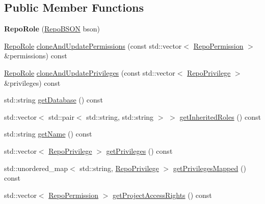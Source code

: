 \subsection*{Public Member Functions}
\begin{DoxyCompactItemize}
\item 
\hypertarget{classrepo_1_1core_1_1model_1_1_repo_role_af9ddc044e897b262065504697e87d756}{}{\bfseries Repo\+Role} (\hyperlink{classrepo_1_1core_1_1model_1_1_repo_b_s_o_n}{Repo\+B\+S\+O\+N} bson)\label{classrepo_1_1core_1_1model_1_1_repo_role_af9ddc044e897b262065504697e87d756}

\item 
\hyperlink{classrepo_1_1core_1_1model_1_1_repo_role}{Repo\+Role} \hyperlink{classrepo_1_1core_1_1model_1_1_repo_role_abdb1f705fc8aa347ffdfbb382fa36160}{clone\+And\+Update\+Permissions} (const std\+::vector$<$ \hyperlink{structrepo_1_1core_1_1model_1_1_repo_permission}{Repo\+Permission} $>$ \&permissions) const 
\item 
\hyperlink{classrepo_1_1core_1_1model_1_1_repo_role}{Repo\+Role} \hyperlink{classrepo_1_1core_1_1model_1_1_repo_role_ac4e6810785f991ba81a93303237755b8}{clone\+And\+Update\+Privileges} (const std\+::vector$<$ \hyperlink{structrepo_1_1core_1_1model_1_1_repo_privilege}{Repo\+Privilege} $>$ \&privileges) const 
\item 
std\+::string \hyperlink{classrepo_1_1core_1_1model_1_1_repo_role_a81cff4cca13d027e88e7020338b004f3}{get\+Database} () const 
\item 
std\+::vector$<$ std\+::pair$<$ std\+::string, std\+::string $>$ $>$ \hyperlink{classrepo_1_1core_1_1model_1_1_repo_role_a6b7b3309caf6cd2bf0aec3b3f8ed68a4}{get\+Inherited\+Roles} () const 
\item 
std\+::string \hyperlink{classrepo_1_1core_1_1model_1_1_repo_role_ac57aefb6a3ae9fdf9f7796d604a674ac}{get\+Name} () const 
\item 
std\+::vector$<$ \hyperlink{structrepo_1_1core_1_1model_1_1_repo_privilege}{Repo\+Privilege} $>$ \hyperlink{classrepo_1_1core_1_1model_1_1_repo_role_a6e4e64c76b02513aef77ab5f4af9ff59}{get\+Privileges} () const 
\item 
std\+::unordered\+\_\+map$<$ std\+::string, \hyperlink{structrepo_1_1core_1_1model_1_1_repo_privilege}{Repo\+Privilege} $>$ \hyperlink{classrepo_1_1core_1_1model_1_1_repo_role_a793296fd3b70c40528bb30550f71c4b9}{get\+Privileges\+Mapped} () const 
\item 
std\+::vector$<$ \hyperlink{structrepo_1_1core_1_1model_1_1_repo_permission}{Repo\+Permission} $>$ \hyperlink{classrepo_1_1core_1_1model_1_1_repo_role_a8058f6f6ac80ec95a6306a18e761b9eb}{get\+Project\+Access\+Rights} () const 
\end{DoxyCompactItemize}
